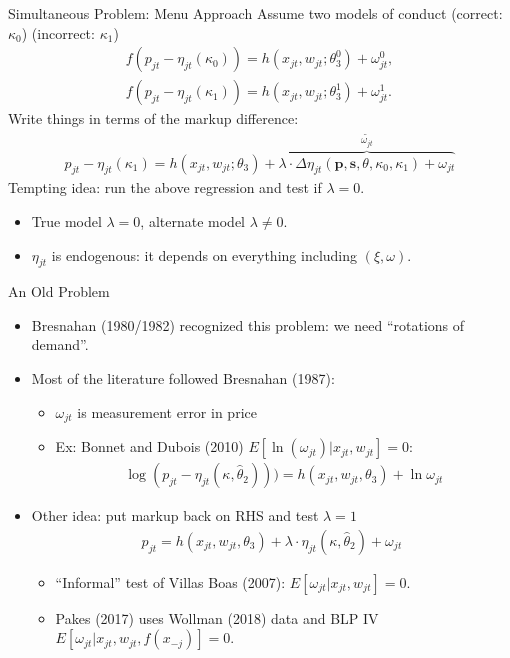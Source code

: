 \documentclass[xcolor=pdftex,dvipsnames,table,mathserif,aspectratio=169]{beamer}
\begin{document}
\begin{frame}{Simultaneous Problem: Menu Approach}
Assume two models of conduct (correct: $\kappa_0$) (incorrect: $\kappa_1$)
\begin{align*}
f(p_{jt} -\eta_{jt}(\kappa_0))= h(x_{jt},w_{jt};\theta_3^0)+  \omega_{jt}^{0},\\
f(p_{jt} -\eta_{jt}(\kappa_1))= h(x_{jt},w_{jt};\theta_3^1)+  \omega_{jt}^{1}.
\end{align*}
Write things in terms of the markup difference:
\begin{align*}
p_{jt} -\eta_{jt}(\kappa_1)= h(x_{jt},w_{jt};\theta_3)+ \overbrace{\lambda \cdot  \Delta \eta_{jt}(\mathbf{p},\mathbf{s},\theta,\kappa_0,\kappa_1) +   \omega_{jt}}^{\widetilde{\omega_{jt}}}
\end{align*}
Tempting idea: run the above regression and test if $\lambda=0$.
\begin{itemize}
\item True model $\lambda=0$, alternate model $\lambda \neq 0$. \pause
\item $\eta_{jt}$ is \alert{endogenous}: it depends on everything including $(\xi,\omega)$.
\end{itemize}
\end{frame}


\begin{frame}{An Old Problem}
\begin{itemize}
\item Bresnahan (1980/1982) recognized this problem: we need ``rotations of demand''.
\item Most of the literature followed Bresnahan (1987):
\begin{itemize}
\item $\omega_{jt}$ is \alert{measurement error in price} 
\item Ex: Bonnet and Dubois (2010) $E[\ln(\omega_{jt}) | x_{jt},w_{jt}]=0$:
\begin{align*}
\log(p_{jt} -\eta_{jt}(\kappa,\widehat{\theta}_2))) = h(x_{jt},w_{jt},\theta_3) + \ln \omega_{jt}
\end{align*}
\end{itemize}
\item Other idea: put markup back on RHS and test $\lambda=1$
\begin{align*}
p_{jt} = h(x_{jt},w_{jt},\theta_3)+ \lambda\cdot  \eta_{jt}(\kappa,\widehat{\theta}_2)+ \omega_{jt}
\end{align*}
\begin{itemize}
\item ``Informal'' test of Villas Boas (2007): $E[\omega_{jt} | x_{jt},w_{jt}]=0$.
\item Pakes (2017) uses Wollman (2018) data and BLP IV $E[\omega_{jt} | x_{jt},w_{jt},f(x_{-j})]=0$.
\end{itemize}
\end{itemize}
\end{frame}
\end{document}
